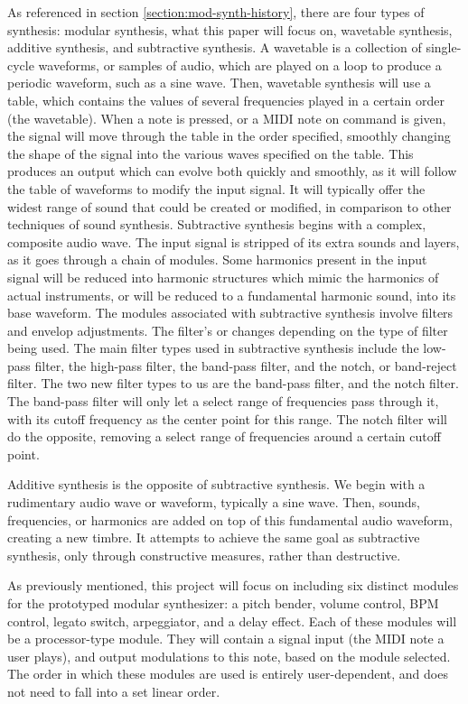 As referenced in section \ref{section:mod-synth-history}, there are four types of synthesis: modular synthesis, what this paper will focus on, wavetable synthesis, additive synthesis, and subtractive synthesis. A wavetable is a collection of single-cycle waveforms, or samples of audio, which are played on a loop to produce a periodic waveform, such as a sine wave. Then, wavetable synthesis will use a table, which contains the values of several frequencies played in a certain order (the wavetable). When a note is pressed, or a MIDI note on command is given, the signal will move through the table in the order specified, smoothly changing the shape of the signal into the various waves specified on the table. This produces an output which can evolve both quickly and smoothly, as it will follow the table of waveforms to modify the input signal. It will typically offer the widest range of sound that could be created or modified, in comparison to other techniques of sound synthesis\cite{Gabrielli_2020}.
Subtractive synthesis begins with a complex, composite audio wave. The input signal is stripped of its extra sounds and layers, as it goes through a chain of modules. Some harmonics present in the input signal will be reduced into harmonic structures which mimic the harmonics of actual instruments, or will be reduced to a fundamental harmonic sound, into its base waveform\cite{Gabrielli_2020}. The modules associated with subtractive synthesis involve filters and envelop adjustments. The filter's  or  changes depending on the type of filter being used. The main filter types used in subtractive synthesis include the low-pass filter, the high-pass filter, the band-pass filter, and the notch, or band-reject filter. The two new filter types to us are the band-pass filter, and the notch filter. The band-pass filter will only let a select range of frequencies pass through it, with its cutoff frequency as the center point for this range. The notch filter will do the opposite, removing a select range of frequencies around a certain cutoff point\cite{Gabrielli_2020}.

Additive synthesis is the opposite of subtractive synthesis. We begin with a rudimentary audio wave or waveform, typically a sine wave. Then, sounds, frequencies, or harmonics are added on top of this fundamental audio waveform, creating a new timbre\cite{Winer_2018}. It attempts to achieve the same goal as subtractive synthesis, only through constructive measures, rather than destructive. 

As previously mentioned, this project will focus on including six distinct modules for the prototyped modular synthesizer: a pitch bender, volume control, BPM control, legato switch, arpeggiator, and a delay effect. Each of these modules will be a processor-type module. They will contain a signal input (the MIDI note a user plays), and output modulations to this note, based on the module selected. The order in which these modules are used is entirely user-dependent, and does not need to fall into a set linear order. 